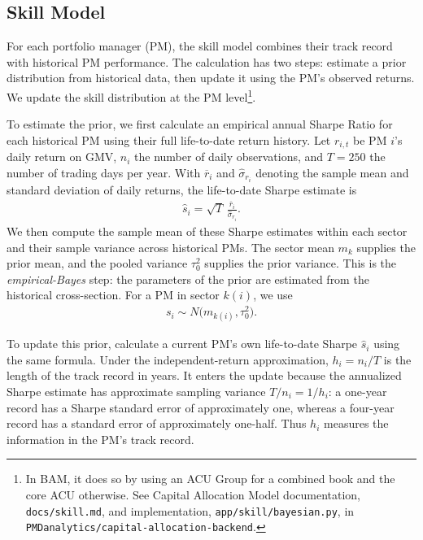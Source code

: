 \documentclass[11pt]{gappyarticle}
\begin{document}
\subsection{Skill Model}
For each portfolio manager (PM), the skill model combines their track record
with historical PM performance. The calculation has two steps: estimate a prior
distribution from historical data, then update it using the PM's observed
returns. We update the skill distribution at the PM
level\footnote{In BAM, it does so by using an ACU Group for a combined book and the core ACU
otherwise. See Capital Allocation Model documentation,
\texttt{docs/skill.md}, and implementation, \texttt{app/skill/bayesian.py},
in \texttt{PMDanalytics/capital-allocation-backend}.}.

To estimate the prior, we first calculate an empirical annual Sharpe Ratio
for each historical PM using their full life-to-date return history.
Let $r_{i,t}$ be PM $i$'s daily return on GMV, $n_i$ the number of daily
observations, and $T=250$ the number of trading days per year. With
$\overline r_i$ and $\hat\sigma_{r_i}$ denoting the sample mean and standard
deviation of daily returns, the life-to-date Sharpe estimate is
\begin{align}
    \hat s_i = \sqrt{T}\,
    \frac{\overline r_i}{\hat\sigma_{r_i}} .
\end{align}
We then compute the sample mean of these Sharpe estimates within each sector
and their sample variance across historical PMs. The sector mean $m_k$ supplies
the prior mean, and the pooled variance $\tau_0^2$ supplies the prior variance.
This is the \emph{empirical-Bayes} step: the parameters of the prior are
estimated from the historical cross-section. For a PM in sector $k(i)$, we use
\begin{align}
    s_i \sim N\bigl(m_{k(i)},\tau_0^2\bigr).
\end{align}

To update this prior, calculate a current PM's own life-to-date Sharpe $\hat s_i$
using the same formula. Under the independent-return approximation,
$h_i=n_i/T$ is the length of the track record in years. It enters the update
because the annualized Sharpe estimate has approximate sampling variance
$T/n_i=1/h_i$: a one-year record has a Sharpe standard error of approximately
one, whereas a four-year record has a standard error of approximately one-half.
Thus $h_i$ measures the information in the PM's track record.
\end{document}

